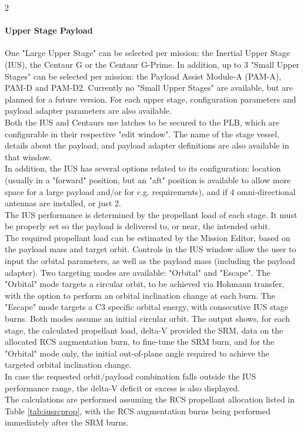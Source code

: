 \documentclass[Space_Shuttle_Vessel_Manual.tex]{subfiles}
\begin{document}
\begin{multicols*}{2}
\paragraph{Upper Stage Payload}
One "Large Upper Stage" can be selected per mission: the Inertial Upper Stage (IUS), the Centaur G or the Centaur G-Prime. In addition, up to 3 "Small Upper Stages" can be selected per mission: the Payload Assist Module-A (PAM-A), PAM-D and PAM-D2. Currently no "Small Upper Stages" are available, but are planned for a future version. For each upper stage, configuration parameters and payload adapter parameters are also available.\\
Both the IUS and Centaurs use latches to be secured to the PLB, which are configurable in their respective "edit window". The name of the stage vessel, details about the payload, and payload adapter definitions are also available in that window.\\
In addition, the IUS has several options related to its configuration: location (usually in a "forward" position, but an "aft" position is available to allow more space for a large payload and/or for c.g. requirements), and if 4 omni-directional antennas are installed, or just 2.\\
The IUS performance is determined by the propellant load of each stage. It must be properly set so the payload is delivered to, or near, the intended orbit.\\
The required propellant load can be estimated by the Mission Editor, based on the payload mass and target orbit. Controls in the IUS window allow the user to input the orbital parameters, as well as the payload mass (including the payload adapter). Two targeting modes are available: "Orbital" and "Escape". The "Orbital" mode targets a circular orbit, to be achieved via Hohmann transfer, with the option to perform an orbital inclination change at each burn. The "Escape" mode targets a C3 specific orbital energy, with consecutive IUS stage burns. Both modes assume an initial circular orbit. The output shows, for each stage, the calculated propellant load, delta-V provided the SRM, data on the allocated RCS augmentation burn, to fine-tune the SRM burn, and for the "Orbital" mode only, the initial out-of-plane angle required to achieve the targeted orbital inclination change.\\
In case the requested orbit/payload combination falls outside the IUS performance range, the delta-V deficit or excess is also displayed.\\
The calculations are performed assuming the RCS propellant allocation listed in Table \ref{tab:iusrcprop}, with the RCS augmentation burns being performed immediately after the SRM burns.


\end{multicols*}
\end{document}
